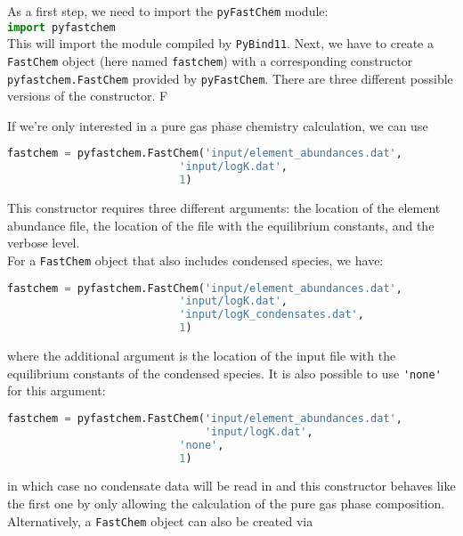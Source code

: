\documentclass[numbers=noenddot]{aux/fcmanual}
\newcommand{\fc}{\texttt{FastChem}\xspace}
\newcommand{\pfc}{\texttt{pyFastChem}\xspace}
\newcommand{\pb}{\texttt{PyBind11}\xspace}
\begin{document}
As a first step, we need to import the \pfc module:\\

\lstinline[language=Python]!import pyfastchem!\\

This will import the module compiled by \pb. Next, we have to create a \fc object (here named \lstinline[language=Python]!fastchem!) with a corresponding constructor \lstinline[language=Python]!pyfastchem.FastChem! provided by \pfc. There are three different possible versions of the constructor. F

If we're only interested in a pure gas phase chemistry calculation, we can use
\begin{lstlisting}[language=Python]
fastchem = pyfastchem.FastChem('input/element_abundances.dat', 
	                       'input/logK.dat', 
	                       1)
\end{lstlisting}

This constructor requires three different arguments: the location of the element abundance file, the location of the file with the equilibrium constants, and the verbose level. \\

For a \fc object that also includes condensed species, we have:
\begin{lstlisting}[language=Python]
fastchem = pyfastchem.FastChem('input/element_abundances.dat', 
	                       'input/logK.dat', 
	                       'input/logK_condensates.dat', 
	                       1)
\end{lstlisting}

where the additional argument is the location of the input file with the equilibrium constants of the condensed species. It is also possible to use \verb|'none'| for this argument:

\begin{lstlisting}[language=Python]
fastchem = pyfastchem.FastChem('input/element_abundances.dat', 
                               'input/logK.dat', 
	                       'none', 
	                       1)
\end{lstlisting}

in which case no condensate data will be read in and this constructor behaves like the first one by only allowing the calculation of the pure gas phase composition.\\

Alternatively, a \fc object can also be created via\\
\end{document}
